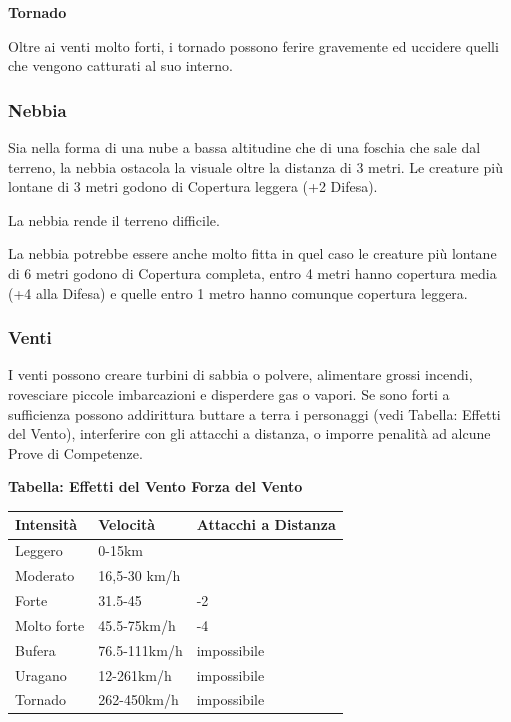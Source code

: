 \begin{multicols}{2}
\textbf{Tornado}

Oltre ai venti molto forti, i tornado possono ferire gravemente ed uccidere quelli che vengono catturati al suo interno.

\subsubsection{Nebbia}

\label{nebbia}

Sia nella forma di una nube a bassa altitudine che di una foschia che sale dal terreno, la nebbia ostacola la visuale oltre la distanza di 3 metri. Le creature più lontane di 3 metri godono di Copertura leggera (+2 Difesa).

La nebbia rende il terreno difficile.

La nebbia potrebbe essere anche molto fitta in quel caso le creature più lontane di 6 metri godono di Copertura completa, entro 4 metri hanno copertura media (+4 alla Difesa) e quelle entro 1 metro hanno comunque copertura leggera.

\subsubsection{Venti}

\label{venti}

I venti possono creare turbini di sabbia o polvere, alimentare grossi incendi, rovesciare piccole imbarcazioni e disperdere gas o vapori. Se sono forti a sufficienza possono addirittura buttare a terra i personaggi (vedi Tabella: Effetti del Vento), interferire con gli attacchi a distanza, o imporre penalità ad alcune Prove di Competenze.

\medskip

\textbf{Tabella: Effetti del Vento Forza del Vento}

\medskip

\begin{tabularx}{0.45\textwidth}{llX}
\textbf{Intensità} & \textbf{Velocità} & \textbf{Attacchi a Distanza} \\
\toprule
Leggero & 0-15km &\\
Moderato & 16,5-30 km/h& \\
Forte & 31.5-45 & -2 \\
Molto forte & 45.5-75km/h & -4 \\
Bufera & 76.5-111km/h & impossibile \\
Uragano & 12-261km/h & impossibile \\
Tornado & 262-450km/h & impossibile
\end{tabularx}


\end{multicols}
